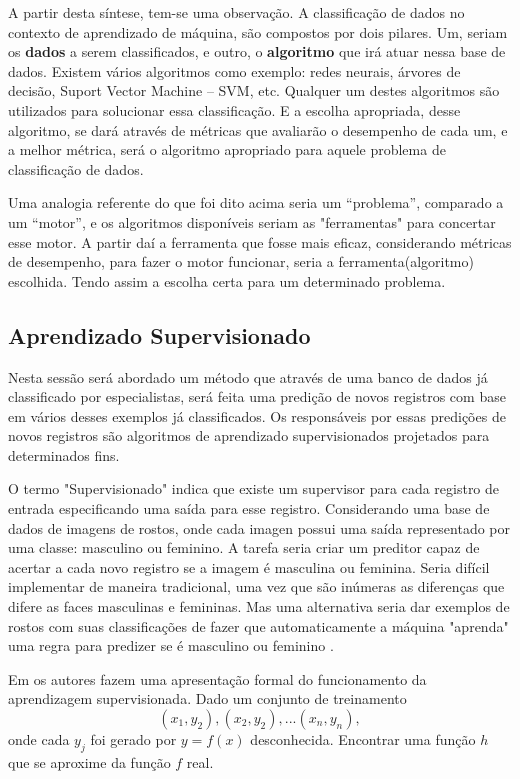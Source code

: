 A partir desta síntese, tem-se uma observação. A classificação de dados no contexto de aprendizado de máquina, são compostos por dois pilares. Um, seriam os \textbf{dados} a serem classificados, e outro, o \textbf{algoritmo} que irá atuar nessa base de dados. Existem vários algoritmos como exemplo: redes neurais, árvores de decisão, Suport Vector Machine – SVM, etc. Qualquer um destes algoritmos são utilizados para solucionar essa classificação. E a escolha apropriada, desse algoritmo, se dará através de métricas que avaliarão o desempenho de cada um, e a melhor métrica, será o algoritmo apropriado para aquele problema de classificação de dados. 

Uma analogia referente do que foi dito acima seria um “problema”,  comparado a um “motor”, e os algoritmos disponíveis seriam as "ferramentas" para concertar esse motor. A partir daí a ferramenta que fosse mais eficaz, considerando métricas de desempenho, para fazer o motor funcionar, seria a ferramenta(algoritmo) escolhida. Tendo assim a escolha certa para um determinado problema.

\subsection{Aprendizado Supervisionado}\label{cap:refTeor:ssec:aprendSup}

Nesta sessão será abordado um método que através de uma banco de dados já classificado por especialistas, será feita uma predição de novos registros com base em vários desses exemplos já classificados. Os responsáveis por essas predições de novos registros são algoritmos de aprendizado supervisionados projetados para determinados fins.


O termo "Supervisionado" indica que existe um supervisor para cada registro de entrada especificando uma saída para esse registro. Considerando uma base de dados de imagens de rostos, onde cada imagen possui uma saída representado por uma classe: masculino ou feminino. A tarefa seria criar um preditor capaz de acertar a cada novo registro se a imagem é masculina ou feminina. Seria  difícil  implementar de maneira tradicional, uma vez que são inúmeras as diferenças que difere as faces masculinas e femininas. Mas uma alternativa seria dar exemplos de rostos com suas classificações de fazer que automaticamente a máquina "aprenda" uma regra para predizer se é masculino ou feminino \cite{Barber2011}.

Em \cite{RusselStuart.Norvig2013} os autores fazem uma apresentação formal do funcionamento da aprendizagem supervisionada. Dado um conjunto de treinamento 
\begin{equation}
 (x_{1},y_{2}),(x_{2},y_{2}),...(x_{n},y_{n}),
 \label{eq:aprendSup}
\end{equation}
onde cada ${y_{j}} $ foi gerado por ${y=f(x)}$ desconhecida. Encontrar uma função ${h}$ que se aproxime da função ${f}$ real.

